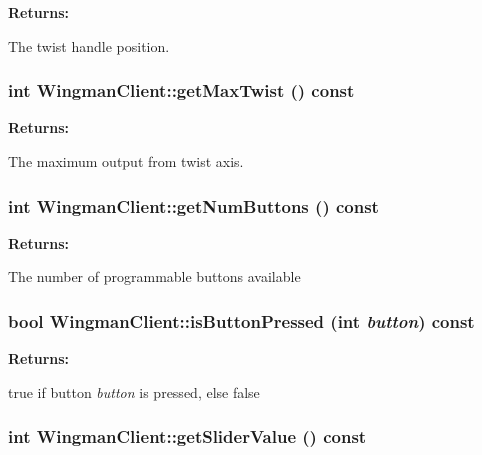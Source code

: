 \begin{Desc}
\item[{\bf Returns: }]\par
 The twist handle position. \end{Desc}
\hypertarget{class_WingmanClient_a8}{
\subsubsection[getMaxTwist]{\setlength{\rightskip}{0pt plus 5cm}int Wingman\-Client::get\-Max\-Twist () const}}
\label{class_WingmanClient_a8}


\begin{Desc}
\item[{\bf Returns: }]\par
 The maximum output from twist axis. \end{Desc}
\hypertarget{class_WingmanClient_a9}{
\subsubsection[getNumButtons]{\setlength{\rightskip}{0pt plus 5cm}int Wingman\-Client::get\-Num\-Buttons () const}}
\label{class_WingmanClient_a9}


\begin{Desc}
\item[{\bf Returns: }]\par
 The number of programmable buttons available \end{Desc}
\hypertarget{class_WingmanClient_a10}{
\subsubsection[isButtonPressed]{\setlength{\rightskip}{0pt plus 5cm}bool Wingman\-Client::is\-Button\-Pressed (int {\em button}) const}}
\label{class_WingmanClient_a10}


\begin{Desc}
\item[{\bf Returns: }]\par
 true if button {\em button} is pressed, else false \end{Desc}
\hypertarget{class_WingmanClient_a11}{
\subsubsection[getSliderValue]{\setlength{\rightskip}{0pt plus 5cm}int Wingman\-Client::get\-Slider\-Value () const}}
\label{class_WingmanClient_a11}


